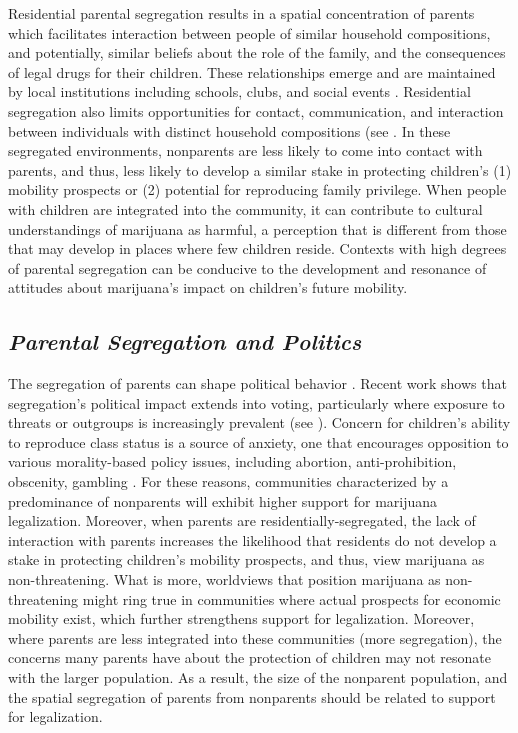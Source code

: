 Residential parental segregation results in a spatial concentration of parents which facilitates interaction between people of similar household compositions, and potentially, similar beliefs about the role of the family, and the consequences of legal drugs for their children. These relationships emerge and are maintained by local institutions including schools, clubs, and social events \citep{beisel_1997}. Residential segregation also limits opportunities for contact, communication, and interaction between individuals with distinct household compositions (see \citep{blau_1977b,blau_1977a}. In these segregated environments, nonparents are less likely to come into contact with parents, and thus, less likely to develop a similar stake in protecting children's (1) mobility prospects or (2) potential for reproducing family privilege. When people with children are integrated into the community, it can contribute to cultural understandings of marijuana as harmful, a perception that is different from those that may develop in places where few children reside. Contexts with high degrees of parental segregation can be conducive to the development and resonance of attitudes about marijuana's impact on children's future mobility.


\subsection{\it{Parental Segregation and Politics}}

The segregation of parents can shape political behavior \citep{beisel_1997}. Recent work shows that segregation's political impact extends into voting, particularly where exposure to threats or outgroups is increasingly prevalent (see \citealt{andrews_and_seguin_2015}). Concern for children's ability to reproduce class status is a source of anxiety, one that encourages opposition to various morality-based policy issues, including abortion, anti-prohibition, obscenity, gambling \citep{luker_1984,gusfield_1963,beisel_1997}. For these reasons, communities characterized by a predominance of nonparents will exhibit higher support for marijuana legalization. Moreover, when parents are residentially-segregated, the lack of interaction with parents increases the likelihood that residents do not develop a stake in protecting children's mobility prospects, and thus, view marijuana as non-threatening. What is more, worldviews that position marijuana as non-threatening might ring true in communities where actual prospects for economic mobility exist, which further strengthens support for legalization. Moreover, where parents are less integrated into these communities (more segregation), the concerns many parents have about the protection of children may not resonate with the larger population. As a result, the size of the nonparent population, and the spatial segregation of parents from nonparents should be related to support for legalization. 



